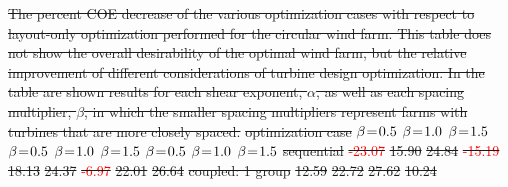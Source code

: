 \documentclass[wes, manuscript]{copernicus}
\providecommand{\DIFdel}[1]{{\protect\color{red}\sout{#1}}}                      %
\providecommand{\DIFdelFL}[1]{\DIFdel{#1}} %
\begin{document}
{%
\DIFdelFL{The percent COE decrease of the various optimization cases with respect to layout-only optimization performed for the circular wind farm. This table does not show the overall desirability of the optimal wind farm, but the relative improvement of different considerations of turbine design optimization. In the table are shown results for each shear exponent, $\alpha$, as well as each spacing multiplier, $\beta$, in which the smaller spacing multipliers represent farms with turbines that are more closely spaced.}}
\DIFdelFL{optimization case }%
\DIFdelFL{$\beta\mkern1.5mu{=}\mkern1.5mu0.5$ }%
\DIFdelFL{$\beta\mkern1.5mu{=}\mkern1.5mu1.0$ }%
\DIFdelFL{$\beta\mkern1.5mu{=}\mkern1.5mu1.5$ }%
\DIFdelFL{$\beta\mkern1.5mu{=}\mkern1.5mu0.5$ }%
\DIFdelFL{$\beta\mkern1.5mu{=}\mkern1.5mu1.0$ }%
\DIFdelFL{$\beta\mkern1.5mu{=}\mkern1.5mu1.5$}%
\DIFdelFL{$\beta\mkern1.5mu{=}\mkern1.5mu0.5$ }%
\DIFdelFL{$\beta\mkern1.5mu{=}\mkern1.5mu1.0$ }%
\DIFdelFL{$\beta\mkern1.5mu{=}\mkern1.5mu1.5$}%
\DIFdelFL{sequential }%
\DIFdelFL{\textcolor{red}{-23.07} }%
\DIFdelFL{15.90 }%
\DIFdelFL{24.84 }%
\DIFdelFL{\textcolor{red}{-15.19}  }%
\DIFdelFL{18.13 }%
\DIFdelFL{24.37 }%
\DIFdelFL{\textcolor{red}{-6.97}  }%
\DIFdelFL{22.01 }%
\DIFdelFL{26.64}%
\DIFdelFL{coupled: 1 group}%
\DIFdelFL{12.59  }%
\DIFdelFL{22.72  }%
\DIFdelFL{27.62  }%
\DIFdelFL{10.24  }%
\end{document}
